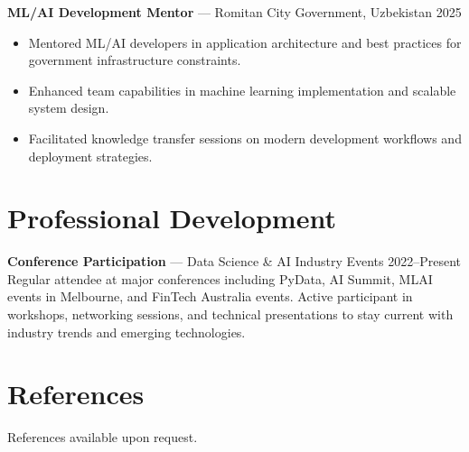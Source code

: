 \documentclass[10pt,letterpaper]{article}
\begin{document}
\textbf{ML/AI Development Mentor} — Romitan City Government, Uzbekistan \hfill 2025\\[-1.5em]
\begin{itemize}
  \item Mentored ML/AI developers in application architecture and best practices for government infrastructure constraints.
  \item Enhanced team capabilities in machine learning implementation and scalable system design.
  \item Facilitated knowledge transfer sessions on modern development workflows and deployment strategies.
\end{itemize}

\section*{Professional Development}

\textbf{Conference Participation} — Data Science \& AI Industry Events \hfill 2022--Present\\
Regular attendee at major conferences including PyData, AI Summit, MLAI events in Melbourne, and FinTech Australia events. Active participant in workshops, networking sessions, and technical presentations to stay current with industry trends and emerging technologies.

\section*{References}

References available upon request.
\end{document}
